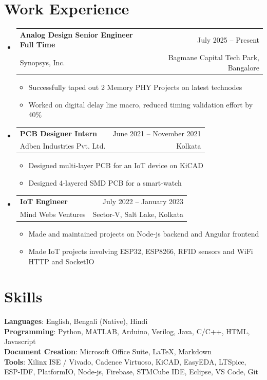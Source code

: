 \documentclass[11pt]{article}
\makeatletter
\newcommand{\CVItem}[1]{
  \item\small{
    {#1 \vspace{-2pt}}
  }
}
\newcommand{\CVSubheading}[4]{
  \vspace{-2pt}\item
    \begin{tabular*}{0.97\textwidth}[t]{l@{\extracolsep{\fill}}r}
      \textbf{#1} & #2 \\
      \small#3 & \small #4 \\
    \end{tabular*}\vspace{-7pt}
}
\newcommand{\CVSubHeadingListStart}{\begin{itemize}[leftmargin=0.5cm, label={}]}
\newcommand{\CVSubHeadingListEnd}{\end{itemize}}
\newcommand{\CVItemListStart}{\begin{itemize}}
\newcommand{\CVItemListEnd}{\end{itemize}\vspace{-5pt}}
\makeatother
\begin{document}
\section{Work Experience}
  \CVSubHeadingListStart
\CVSubheading
{Analog Design Senior Engineer Full Time}{July 2025 -- Present}
{Synopsys, Inc.}{Bagmane Capital Tech Park, Bangalore}
\CVItemListStart
\CVItem{Successfully taped out 2 Memory PHY Projects on latest technodes}
\CVItem{Worked on digital delay line macro, reduced timing validation effort by 40\%}
\CVItemListEnd
\CVSubheading
{PCB Designer Intern}{June 2021 -- November 2021}
{Adben Industries Pvt. Ltd.}{Kolkata}
\CVItemListStart
\CVItem{Designed multi-layer PCB for an IoT device on KiCAD}
\CVItem{Designed 4-layered SMD PCB for a smart-watch}
\CVItemListEnd
\CVSubheading
{IoT Engineer}{July 2022 -- January 2023}
{Mind Webs Ventures}{Sector-V, Salt Lake, Kolkata}
\CVItemListStart
\CVItem{Made and maintained projects on Node-js backend and Angular frontend}
\CVItem{Made IoT projects involving ESP32, ESP8266, RFID sensors and WiFi HTTP and SocketIO}
\CVItemListEnd

    
  \CVSubHeadingListEnd


\section{Skills}
 \begin{itemize}[leftmargin=0.5cm, label={}]
    \small{\item{
     \textbf{Languages}{: English, Bengali (Native), Hindi} \\
     \textbf{Programming}{: Python, MATLAB, Arduino, Verilog, Java, C/C++, HTML, Javascript} \\
     \textbf{Document Creation}{: Microsoft Office Suite, LaTeX, Markdown} \\
     \textbf{Tools}{: Xilinx ISE / Vivado, Cadence Virtuoso, KiCAD, EasyEDA, LTSpice, ESP-IDF, PlatformIO, Node-js, Firebase, STMCube IDE, Eclipse, VS Code, Git} \\
    }}
 \end{itemize}
\end{document}
